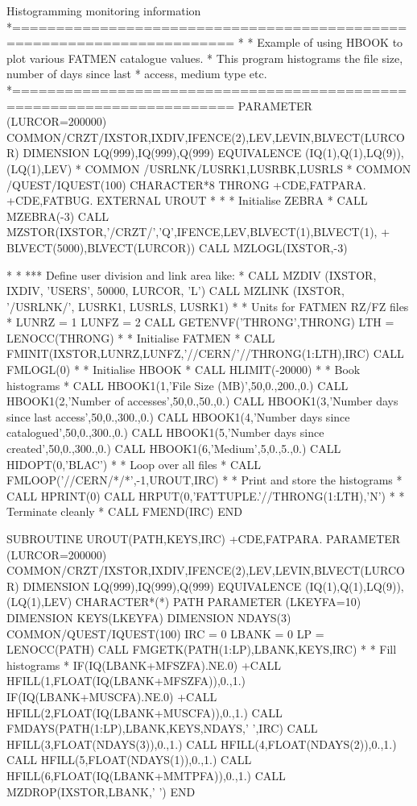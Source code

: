 \begin{XMPt}{Histogramming monitoring information}
*=======================================================================
*
*  Example of using HBOOK to plot various FATMEN catalogue values.
*  This program histograms the file size, number of days since last
*  access, medium type etc.
*=======================================================================
      PARAMETER (LURCOR=200000)
      COMMON/CRZT/IXSTOR,IXDIV,IFENCE(2),LEV,LEVIN,BLVECT(LURCOR)
      DIMENSION    LQ(999),IQ(999),Q(999)
      EQUIVALENCE (IQ(1),Q(1),LQ(9)),(LQ(1),LEV)
*
      COMMON /USRLNK/LUSRK1,LUSRBK,LUSRLS
*
      COMMON /QUEST/IQUEST(100)
      CHARACTER*8   THRONG
+CDE,FATPARA.
+CDE,FATBUG.
      EXTERNAL      UROUT
*
*
*     Initialise ZEBRA
*
      CALL MZEBRA(-3)
      CALL MZSTOR(IXSTOR,'/CRZT/','Q',IFENCE,LEV,BLVECT(1),BLVECT(1),
     +            BLVECT(5000),BLVECT(LURCOR))
      CALL MZLOGL(IXSTOR,-3)
 
*
* *** Define user division and link area like:
*
      CALL MZDIV  (IXSTOR, IXDIV, 'USERS', 50000, LURCOR, 'L')
      CALL MZLINK (IXSTOR, '/USRLNK/', LUSRK1, LUSRLS, LUSRK1)
*
*     Units for FATMEN RZ/FZ files
*
      LUNRZ = 1
      LUNFZ = 2
      CALL GETENVF('THRONG',THRONG)
      LTH = LENOCC(THRONG)
*
*     Initialise FATMEN
*
      CALL FMINIT(IXSTOR,LUNRZ,LUNFZ,'//CERN/'//THRONG(1:LTH),IRC)
      CALL FMLOGL(0)
*
*     Initialise HBOOK
*
      CALL HLIMIT(-20000)
*
*     Book histograms
*
      CALL HBOOK1(1,'File Size (MB)',50,0.,200.,0.)
      CALL HBOOK1(2,'Number of accesses',50,0.,50.,0.)
      CALL HBOOK1(3,'Number days since last access',50,0.,300.,0.)
      CALL HBOOK1(4,'Number days since catalogued',50,0.,300.,0.)
      CALL HBOOK1(5,'Number days since created',50,0.,300.,0.)
      CALL HBOOK1(6,'Medium',5,0.,5.,0.)
      CALL HIDOPT(0,'BLAC')
*
*     Loop over all files
*
      CALL FMLOOP('//CERN/*/*',-1,UROUT,IRC)
*
*     Print and store the histograms
*
      CALL HPRINT(0)
      CALL HRPUT(0,'FATTUPLE.'//THRONG(1:LTH),'N')
*
*     Terminate cleanly
*
      CALL FMEND(IRC)
      END
 
      SUBROUTINE UROUT(PATH,KEYS,IRC)
+CDE,FATPARA.
      PARAMETER (LURCOR=200000)
      COMMON/CRZT/IXSTOR,IXDIV,IFENCE(2),LEV,LEVIN,BLVECT(LURCOR)
      DIMENSION    LQ(999),IQ(999),Q(999)
      EQUIVALENCE (IQ(1),Q(1),LQ(9)),(LQ(1),LEV)
      CHARACTER*(*) PATH
      PARAMETER     (LKEYFA=10)
      DIMENSION     KEYS(LKEYFA)
      DIMENSION     NDAYS(3)
      COMMON/QUEST/IQUEST(100)
      IRC   = 0
      LBANK = 0
      LP    = LENOCC(PATH)
      CALL FMGETK(PATH(1:LP),LBANK,KEYS,IRC)
*
*     Fill histograms
*
      IF(IQ(LBANK+MFSZFA).NE.0)
     +CALL HFILL(1,FLOAT(IQ(LBANK+MFSZFA)),0.,1.)
      IF(IQ(LBANK+MUSCFA).NE.0)
     +CALL HFILL(2,FLOAT(IQ(LBANK+MUSCFA)),0.,1.)
      CALL FMDAYS(PATH(1:LP),LBANK,KEYS,NDAYS,' ',IRC)
      CALL HFILL(3,FLOAT(NDAYS(3)),0.,1.)
      CALL HFILL(4,FLOAT(NDAYS(2)),0.,1.)
      CALL HFILL(5,FLOAT(NDAYS(1)),0.,1.)
      CALL HFILL(6,FLOAT(IQ(LBANK+MMTPFA)),0.,1.)
      CALL MZDROP(IXSTOR,LBANK,' ')
      END
\end{XMPt}

